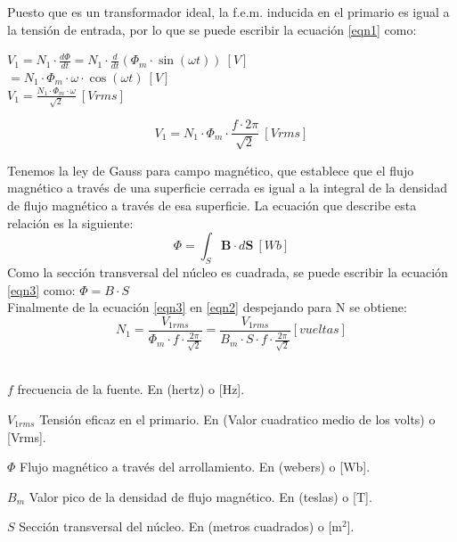Puesto que es un transformador ideal, la f.e.m. inducida en el primario es igual a la tensión de entrada, por lo que se puede escribir la ecuación \ref{eqn1} como:

\begin{center}
    $V_1 = N_1 \cdot \frac{d\Phi}{dt} = N_1 \cdot \frac{d}{dt}(\Phi_m \cdot \sin(\omega t))\ [V]$
    \\
    $= N_1 \cdot \Phi_m \cdot \omega \cdot \cos(\omega t)\ [V]$
    \\
    $V_1 = \frac{N_1 \cdot \Phi_m \cdot \omega}{\sqrt{2}} \ [Vrms]$
\end{center}
\begin{equation}
    \label{eqn2}
    V_1 =N_1 \cdot \Phi_m \cdot \frac{f \cdot 2\pi}{\sqrt{2}}\ [Vrms]
\end{equation}
\vspace{0.3cm}

Tenemos la ley de Gauss para campo magnético, que establece que el flujo magnético a través de una superficie cerrada es igual a la integral de la densidad de flujo magnético a través de esa superficie. La ecuación que describe esta relación es la siguiente:
\begin{equation}
    \label{eqn3}
    \Phi = \int_S \mathbf{B} \cdot d\mathbf{S}\ [Wb]
\end{equation}
Como la sección transversal del núcleo es cuadrada, se puede escribir la ecuación \ref{eqn3} como: $\Phi = B \cdot S$
\\
Finalmente de la ecuación \ref{eqn3} en \ref{eqn2} despejando para N se obtiene:
\\
\begin{equation}
    \label{eqn4}
    N_1 = \frac{V_{1rms}}{\Phi_m \cdot f \cdot \frac{2\pi}{\sqrt{2}}} = \frac{V_{1rms}}{B_m\cdot S\cdot f \cdot \frac{2\pi}{\sqrt{2}}} [vueltas] 
\end{equation}
\\
\begin{IEEEdescription}[\IEEEsetlabelwidth{$e,N,S$}]
\item[$f$] frecuencia de la fuente. En (hertz) o [Hz].
\mbox{}
\item[$V_{1rms}$] Tensión eficaz en el primario. En (Valor cuadratico medio de los volts) o [Vrms].
\item[$\Phi$] Flujo magnético a través del arrollamiento. En (webers) o [Wb].
\item[$B_m$] Valor pico de la densidad de flujo magnético. En (teslas) o [T].
\item[$S$] Sección transversal del núcleo. En (metros cuadrados) o [m$^2$].
\end{IEEEdescription}
\vspace{0.5cm}


